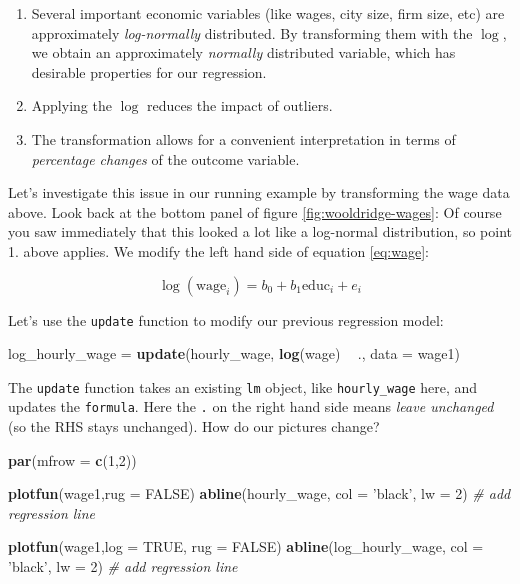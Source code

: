 \documentclass[]{book}
\newenvironment{Shaded}{\begin{snugshade}}{\end{snugshade}}
\newcommand{\CommentTok}[1]{\textcolor[rgb]{0.56,0.35,0.01}{\textit{#1}}}
\newcommand{\DataTypeTok}[1]{\textcolor[rgb]{0.13,0.29,0.53}{#1}}
\newcommand{\DecValTok}[1]{\textcolor[rgb]{0.00,0.00,0.81}{#1}}
\newcommand{\KeywordTok}[1]{\textcolor[rgb]{0.13,0.29,0.53}{\textbf{#1}}}
\newcommand{\NormalTok}[1]{#1}
\newcommand{\OperatorTok}[1]{\textcolor[rgb]{0.81,0.36,0.00}{\textbf{#1}}}
\newcommand{\OtherTok}[1]{\textcolor[rgb]{0.56,0.35,0.01}{#1}}
\newcommand{\StringTok}[1]{\textcolor[rgb]{0.31,0.60,0.02}{#1}}
\providecommand{\tightlist}{%
  \setlength{\itemsep}{0pt}\setlength{\parskip}{0pt}}
\begin{document}
\begin{enumerate}
\def\labelenumi{\arabic{enumi}.}
\tightlist
\item
  Several important economic variables (like wages, city size, firm size, etc) are approximately \emph{log-normally} distributed. By transforming them with the \(\log\), we obtain an approximately \emph{normally} distributed variable, which has desirable properties for our regression.
\item
  Applying the \(\log\) reduces the impact of outliers.
\item
  The transformation allows for a convenient interpretation in terms of \emph{percentage changes} of the outcome variable.
\end{enumerate}

Let's investigate this issue in our running example by transforming the wage data above. Look back at the bottom panel of figure \ref{fig:wooldridge-wages}: Of course you saw immediately that this looked a lot like a log-normal distribution, so point 1. above applies. We modify the left hand side of equation \eqref{eq:wage}:

\begin{equation}
\log(\text{wage}_i) = b_0 + b_1 \text{educ}_i + e_i \label{eq:log-wage}
\end{equation}

Let's use the \texttt{update} function to modify our previous regression model:

\begin{Shaded}
\begin{Highlighting}[]
\NormalTok{log_hourly_wage =}\StringTok{ }\KeywordTok{update}\NormalTok{(hourly_wage, }\KeywordTok{log}\NormalTok{(wage) }\OperatorTok{~}\StringTok{ }\NormalTok{., }\DataTypeTok{data =}\NormalTok{ wage1)}
\end{Highlighting}
\end{Shaded}

The \texttt{update} function takes an existing \texttt{lm} object, like \texttt{hourly\_wage} here, and updates the \texttt{formula}. Here the \texttt{.} on the right hand side means \emph{leave unchanged} (so the RHS stays unchanged). How do our pictures change?

\begin{Shaded}
\begin{Highlighting}[]
\KeywordTok{par}\NormalTok{(}\DataTypeTok{mfrow =} \KeywordTok{c}\NormalTok{(}\DecValTok{1}\NormalTok{,}\DecValTok{2}\NormalTok{))}

\KeywordTok{plotfun}\NormalTok{(wage1,}\DataTypeTok{rug =} \OtherTok{FALSE}\NormalTok{)}
\KeywordTok{abline}\NormalTok{(hourly_wage, }\DataTypeTok{col =} \StringTok{'black'}\NormalTok{, }\DataTypeTok{lw =} \DecValTok{2}\NormalTok{) }\CommentTok{# add regression line}

\KeywordTok{plotfun}\NormalTok{(wage1,}\DataTypeTok{log =} \OtherTok{TRUE}\NormalTok{, }\DataTypeTok{rug =} \OtherTok{FALSE}\NormalTok{)}
\KeywordTok{abline}\NormalTok{(log_hourly_wage, }\DataTypeTok{col =} \StringTok{'black'}\NormalTok{, }\DataTypeTok{lw =} \DecValTok{2}\NormalTok{) }\CommentTok{# add regression line}
\end{Highlighting}
\end{Shaded}
\end{document}
